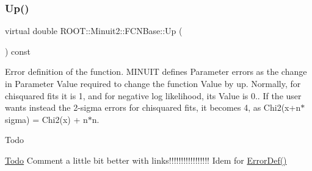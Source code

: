 \subsubsection{\texorpdfstring{Up()}{Up()}\hspace{0.1cm}{\footnotesize\ttfamily [2/3]}}
{\footnotesize\ttfamily virtual double R\+O\+O\+T\+::\+Minuit2\+::\+F\+C\+N\+Base\+::\+Up (\begin{DoxyParamCaption}{ }\end{DoxyParamCaption}) const\hspace{0.3cm}{\ttfamily [pure virtual]}}

Error definition of the function. M\+I\+N\+U\+IT defines Parameter errors as the change in Parameter Value required to change the function Value by up. Normally, for chisquared fits it is 1, and for negative log likelihood, its Value is 0.. If the user wants instead the 2-\/sigma errors for chisquared fits, it becomes 4, as Chi2(x+n$\ast$sigma) = Chi2(x) + n$\ast$n.

\begin{DoxyRefDesc}{Todo}
\item[\mbox{\hyperlink{todo__todo000013}{Todo}}]Comment a little bit better with links!!!!!!!!!!!!!!!!! Idem for \mbox{\hyperlink{classROOT_1_1Minuit2_1_1FCNBase_ac4592475c58a65b037ba97ab5f3cba10}{Error\+Def()}}\end{DoxyRefDesc}


